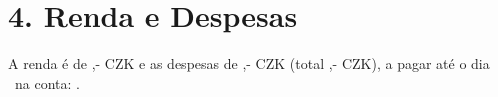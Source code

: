 \section*{4. Renda e Despesas}
A renda é de \Rentrentamount,- CZK e as despesas de \Rentservicesamount,- CZK (total \Renttotalamount,- CZK), a pagar até o dia \Rentpaymentday\ na conta: \Rentbankaccount.
